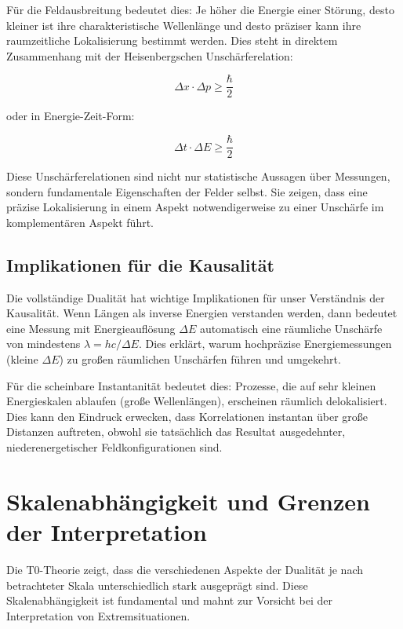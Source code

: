 \documentclass[12pt,a4paper]{article}
\begin{document}
	Für die Feldausbreitung bedeutet dies: Je höher die Energie einer Störung, desto kleiner ist ihre charakteristische Wellenlänge und desto präziser kann ihre raumzeitliche Lokalisierung bestimmt werden. Dies steht in direktem Zusammenhang mit der Heisenbergschen Unschärferelation:
	
	\begin{equation}
		\Delta x \cdot \Delta p \geq \frac{\hbar}{2}
	\end{equation}
	
	oder in Energie-Zeit-Form:
	
	\begin{equation}
		\Delta t \cdot \Delta E \geq \frac{\hbar}{2}
	\end{equation}
	
	Diese Unschärferelationen sind nicht nur statistische Aussagen über Messungen, sondern fundamentale Eigenschaften der Felder selbst. Sie zeigen, dass eine präzise Lokalisierung in einem Aspekt notwendigerweise zu einer Unschärfe im komplementären Aspekt führt.
	
	\subsection{Implikationen für die Kausalität}
	
	Die vollständige Dualität hat wichtige Implikationen für unser Verständnis der Kausalität. Wenn Längen als inverse Energien verstanden werden, dann bedeutet eine Messung mit Energieauflösung $\Delta E$ automatisch eine räumliche Unschärfe von mindestens $\lambda = hc/\Delta E$. Dies erklärt, warum hochpräzise Energiemessungen (kleine $\Delta E$) zu großen räumlichen Unschärfen führen und umgekehrt.
	
	Für die scheinbare Instantanität bedeutet dies: Prozesse, die auf sehr kleinen Energieskalen ablaufen (große Wellenlängen), erscheinen räumlich delokalisiert. Dies kann den Eindruck erwecken, dass Korrelationen instantan über große Distanzen auftreten, obwohl sie tatsächlich das Resultat ausgedehnter, niederenergetischer Feldkonfigurationen sind.
	
	\section{Skalenabhängigkeit und Grenzen der Interpretation}
	
	Die T0-Theorie zeigt, dass die verschiedenen Aspekte der Dualität je nach betrachteter Skala unterschiedlich stark ausgeprägt sind. Diese Skalenabhängigkeit ist fundamental und mahnt zur Vorsicht bei der Interpretation von Extremsituationen.
	
\end{document}
